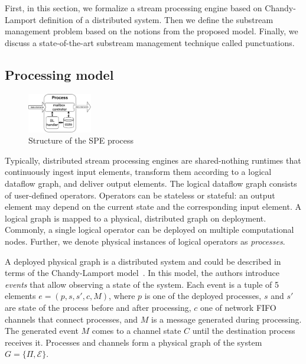 \label{fs-acker-preliminaries}

First, in this section, we formalize a stream processing engine based on Chandy-Lamport definition of a distributed system. Then we define the substream management problem based on the notions from the proposed model. Finally, we discuss a state-of-the-art substream management technique called punctuations.

\subsection{Processing model}

\begin{figure}[htbp]
  \centering
  \includegraphics[width=0.25\textwidth]{pics/process-scheme.pdf}
  \caption{Structure of the SPE process}
  \label{fig:spe_process}
\end{figure}

Typically, distributed stream processing engines are shared-nothing runtimes that continuously ingest input elements, transform them according to a logical dataflow graph, and deliver output elements. The logical dataflow graph consists of user-defined operators. Operators can be stateless or stateful: an output element may depend on the current state and the corresponding input element. A logical graph is mapped to a physical, distributed graph on deployment. Commonly, a single logical operator can be deployed on multiple computational nodes. Further, we denote physical instances of logical operators as {\em processes}.

A deployed physical graph is a distributed system and could be described in terms of the Chandy-Lamport model~\cite{Chandy:1985:DSD:214451.214456, carbone2018scalable}. In this model, the authors introduce \textit{events} that allow observing a state of the system. Each event is a tuple of 5 elements $e = (p, s, s', c, M)$, where $p$ is one of the deployed processes, $s$ and $s'$ are state of the process before and after processing, $c$ one of network FIFO channels that connect processes, and $M$ is a message generated during processing. The generated event $M$ comes to a channel state $C$ until the destination process receives it. Processes and channels form a physical graph of the system $G=\{\Pi,\mathcal{E}\}$.

